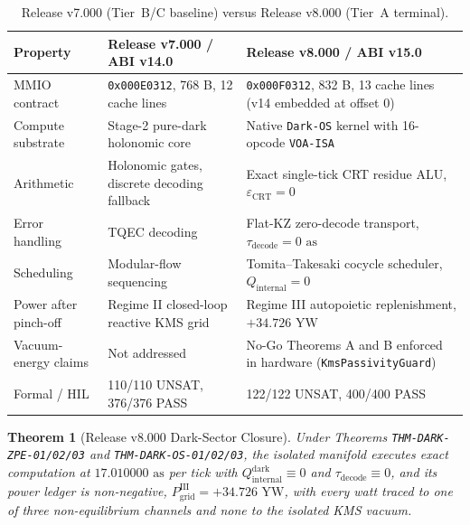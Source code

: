 \documentclass[11pt,onecolumn]{article}
\newtheorem{theorem}{Theorem}
\begin{document}
\begin{table}[!htbp]
\centering\small
\caption{Release v7.000 (Tier~B/C baseline) versus Release v8.000 (Tier~A terminal).}
\label{tab:v7_vs_v8}
\begin{tabularx}{\textwidth}{@{}p{3.6cm} X X@{}}
\toprule
Property & Release v7.000 / ABI v14.0 & Release v8.000 / ABI v15.0 \\
\midrule
MMIO contract & \texttt{0x000E0312}, 768 B, 12 cache lines & \texttt{0x000F0312}, 832 B, 13 cache lines (v14 embedded at offset 0) \\
Compute substrate & Stage-2 pure-dark holonomic core & Native \texttt{Dark-OS} kernel with 16-opcode \texttt{VOA-ISA} \\
Arithmetic & Holonomic gates, discrete decoding fallback & Exact single-tick CRT residue ALU, $\varepsilon_{\text{CRT}}=0$ \\
Error handling & TQEC decoding & Flat-KZ zero-decode transport, $\tau_{\text{decode}}=0\text{ as}$ \\
Scheduling & Modular-flow sequencing & Tomita--Takesaki cocycle scheduler, $Q_{\text{internal}}=0$ \\
Power after pinch-off & Regime II closed-loop reactive KMS grid & Regime III autopoietic replenishment, $+34.726\text{ YW}$ \\
Vacuum-energy claims & Not addressed & No-Go Theorems A and B enforced in hardware (\texttt{KmsPassivityGuard}) \\
Formal / HIL & 110/110 UNSAT, 376/376 PASS & 122/122 UNSAT, 400/400 PASS \\
\bottomrule
\end{tabularx}
\end{table}

\begin{theorem}[Release v8.000 Dark-Sector Closure]
Under Theorems \texttt{THM-DARK-ZPE-01/02/03} and \texttt{THM-DARK-OS-01/02/03}, the isolated manifold executes exact computation at $17.010000\text{ as}$ per tick with $Q_{\text{internal}}^{\text{dark}}\equiv0$ and $\tau_{\text{decode}}\equiv0$, and its power ledger is non-negative, $P_{\text{grid}}^{\text{III}}=+34.726\text{ YW}$, with every watt traced to one of three non-equilibrium channels and none to the isolated KMS vacuum.
\end{theorem}
\end{document}
